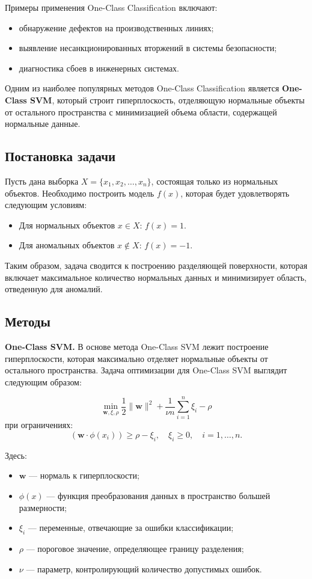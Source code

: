Примеры применения One-Class Classification включают:
\begin{itemize}
    \item обнаружение дефектов на производственных линиях;
    \item выявление несанкционированных вторжений в системы безопасности;
    \item диагностика сбоев в инженерных системах.
\end{itemize}

Одним из наиболее популярных методов One-Class Classification является \textbf{One-Class SVM}, который строит гиперплоскость, отделяющую нормальные объекты от остального пространства с минимизацией объема области, содержащей нормальные данные.

\subsection{Постановка задачи}

Пусть дана выборка \( X = \{x_1, x_2, \dots, x_n\} \), состоящая только из нормальных объектов. Необходимо построить модель \( f(x) \), которая будет удовлетворять следующим условиям:
\begin{itemize}
    \item Для нормальных объектов \( x \in X \): \( f(x) = 1 \).
    \item Для аномальных объектов \( x \notin X \): \( f(x) = -1 \).
\end{itemize}

Таким образом, задача сводится к построению разделяющей поверхности, которая включает максимальное количество нормальных данных и минимизирует область, отведенную для аномалий.

\subsection{Методы}

\textbf{One-Class SVM.} В основе метода One-Class SVM лежит построение гиперплоскости, которая максимально отделяет нормальные объекты от остального пространства. Задача оптимизации для One-Class SVM выглядит следующим образом:

\[
\min_{\mathbf{w}, \xi, \rho} \frac{1}{2} \|\mathbf{w}\|^2 + \frac{1}{\nu n} \sum_{i=1}^n \xi_i - \rho
\]
при ограничениях:
\[
(\mathbf{w} \cdot \phi(x_i)) \geq \rho - \xi_i, \quad \xi_i \geq 0, \quad i = 1, \dots, n.
\]

Здесь:
\begin{itemize}
    \item \( \mathbf{w} \) — нормаль к гиперплоскости;
    \item \( \phi(x) \) — функция преобразования данных в пространство большей размерности;
    \item \( \xi_i \) — переменные, отвечающие за ошибки классификации;
    \item \( \rho \) — пороговое значение, определяющее границу разделения;
    \item \( \nu \) — параметр, контролирующий количество допустимых ошибок.
\end{itemize}

